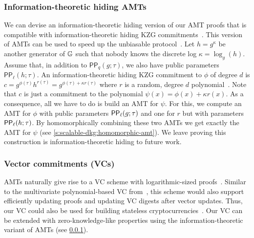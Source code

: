 \subsubsection{Information-theoretic hiding AMTs}
\label{s:amt:information-theoretic-amts}
We can devise an information-theoretic hiding version of our AMT proofs that is compatible with information-theoretic hiding KZG commitments~\cite{polycommit}.
This version of AMTs can be used to speed up the unbiasable \newdkg protocol~\cite{dkg}. 
Let $h=g^{\kappa}$ be another generator of $\mathbb{G}$ such that nobody knows the discrete log $\kappa=\log_g(h)$.
Assume that, in addition to $\mathsf{PP}_q(g; \tau)$, we also have public parameters $\mathsf{PP}_\ell(h;\tau)$.
An information-theoretic hiding KZG commitment to $\phi$ of degree $d$ is $c = g^{\phi(\tau)} h^{r(\tau)} = g^{\phi(\tau)+\kappa r(\tau)}$ where $r$ is a random, degree $d$ polynomial~\cite{polycommit}.
Note that $c$ is just a commitment to the polynomial $\psi(x) = \phi(x) + \kappa r(x)$.
As a consequence, all we have to do is build an AMT for $\psi$.
For this, we compute an AMT for $\phi$ with public parameters $\mathsf{PP}_\ell(g;\tau)$ and one for $r$ but with parameters $\mathsf{PP}_\ell(h;\tau)$.
By homomorphically combining these two AMTs we get exactly the AMT for $\psi$ (see \cref{s:scalable-dkg:homomorphic-amt}).
We leave proving this construction is information-theoretic hiding to future work.

\subsubsection{Vector commitments (VCs)}
AMTs naturally give rise to a VC scheme with logarithmic-sized proofs~\cite{vc}.
Similar to the multivariate polynomial-based VC from~\cite{edrax}, this scheme would also support efficiently updating proofs and updating VC digests after vector updates.
Thus, our VC could also be used for building stateless cryptocurrencies~\cite{edrax,BBF19}.
Our VC can be extended with zero-knowledge-like properties using the information-theoretic variant of AMTs (see \cref{s:amt:information-theoretic-amts}).


